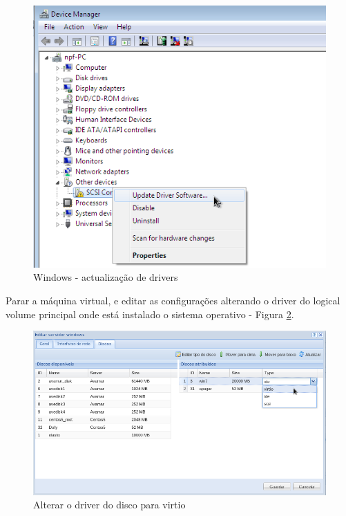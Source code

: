 \begin{figure}[H]
	\begin{center}
	\includegraphics[scale=0.5]{screenshots/virtio/virtio_10.png}
	\caption{Windows - actualização de drivers}
	\label{fig:virtio10}
	\end{center}
\end{figure}

Parar a máquina virtual, e editar as configurações alterando o driver do logical volume principal onde está instalado o sistema operativo - Figura \ref{fig:virtio16}.

\begin{figure}[H]
	\begin{center}
	\includegraphics[scale=0.5]{screenshots/virtio/virtio_16.png}
	\caption{Alterar o driver do disco para virtio}
	\label{fig:virtio16}
	\end{center}
\end{figure}

